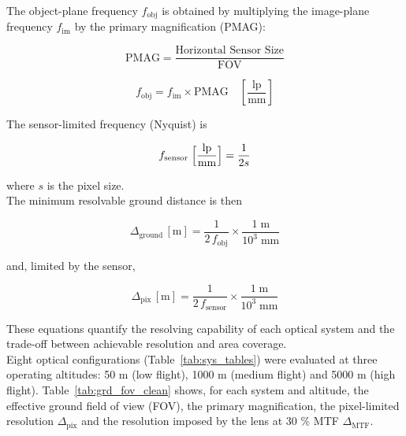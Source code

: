 \noindent The object-plane frequency \(f_{\text{obj}}\) is obtained by
multiplying the image-plane frequency \(f_{\text{im}}\) by the primary
magnification (PMAG):

\begin{equation}
    \text{PMAG}= \frac{\text{Horizontal Sensor Size}}{\text{FOV}}
    \label{eq:pmag}
\end{equation}

\begin{equation}
    f_{\text{obj}} = f_{\text{im}} \times \text{PMAG}
    \quad\left[\frac{\text{lp}}{\text{mm}}\right]
    \label{eq:f_obj}
\end{equation}

\noindent The sensor-limited frequency (Nyquist) is

\begin{equation}
    f_{\text{sensor}}\;\Bigl[\frac{\text{lp}}{\text{mm}}\Bigr] = \frac{1}{2s}
    \label{eq:sensor_res}
\end{equation}

where \(s\) is the pixel size.\\ 

\noindent The minimum resolvable ground distance is then

\begin{equation}
    \Delta_{\text{ground}}\,[\text{m}] =
    \frac{1}{2\,f_{\text{obj}}}\times
    \frac{1\;\text{m}}{10^{3}\;\text{mm}}
    \label{eq:delta_ground}
\end{equation}

 and, limited by the sensor,

\begin{equation}
  \Delta_{\text{pix}}\,[\text{m}] =
  \frac{1}{2\,f_{\text{sensor}}}\times
  \frac{1\;\text{m}}{10^{3}\;\text{mm}}
  \label{eq:delta_ground_sensor}
\end{equation}

\noindent These equations quantify the resolving capability of each optical
system and the trade-off between achievable resolution and area
coverage.\\

\noindent Eight optical configurations (Table~\ref{tab:sys_tables}) were evaluated
at three operating altitudes: 50 m (low flight), 1000 m (medium flight)
and 5000 m (high flight).  Table~\ref{tab:grd_fov_clean} shows, for each
system and altitude, the effective ground field of view (FOV), the
primary magnification, the pixel-limited resolution
\(\Delta_{\mathrm{pix}}\) and the resolution imposed by the lens at
30 \% MTF \(\Delta_{\mathrm{MTF}}\).\\

